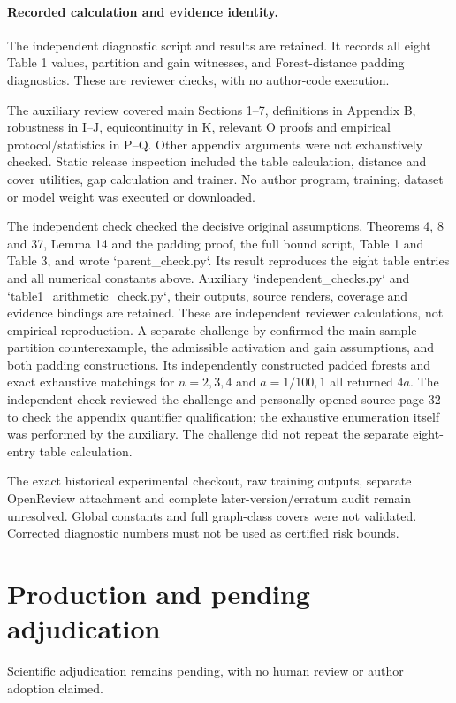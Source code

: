\documentclass[10pt]{article}
\begin{document}
\paragraph*{Recorded calculation and evidence identity.}\mbox{}\par
The independent diagnostic script and results are retained. It records all eight Table 1 values, partition and gain witnesses, and Forest-distance padding diagnostics. These are reviewer checks, with no author-code execution.\par
The auxiliary review covered main Sections 1–7, definitions in Appendix B, robustness in I–J, equicontinuity in K, relevant O proofs and empirical protocol/statistics in P–Q. Other appendix arguments were not exhaustively checked. Static release inspection included the table calculation, distance and cover utilities, gap calculation and trainer. No author program, training, dataset or model weight was executed or downloaded.\par
The independent check checked the decisive original assumptions, Theorems 4, 8 and 37, Lemma 14 and the padding proof, the full bound script, Table 1 and Table 3, and wrote `parent\_check.py`. Its result reproduces the eight table entries and all numerical constants above. Auxiliary `independent\_checks.py` and `table1\_arithmetic\_check.py`, their outputs, source renders, coverage and evidence bindings are retained. These are independent reviewer calculations, not empirical reproduction. A separate challenge by confirmed the main sample-partition counterexample, the admissible activation and gain assumptions, and both padding constructions. Its independently constructed padded forests and exact exhaustive matchings for \(n=2,3,4\) and \(a=1/100,1\) all returned \(4a\). The independent check reviewed the challenge and personally opened source page 32 to check the appendix quantifier qualification; the exhaustive enumeration itself was performed by the auxiliary. The challenge did not repeat the separate eight-entry table calculation.\par
The exact historical experimental checkout, raw training outputs, separate OpenReview attachment and complete later-version/erratum audit remain unresolved. Global constants and full graph-class covers were not validated. Corrected diagnostic numbers must not be used as certified risk bounds.\par
\section*{Production and pending adjudication}
Scientific adjudication remains pending, with no human review or author adoption claimed.\par
\end{document}

